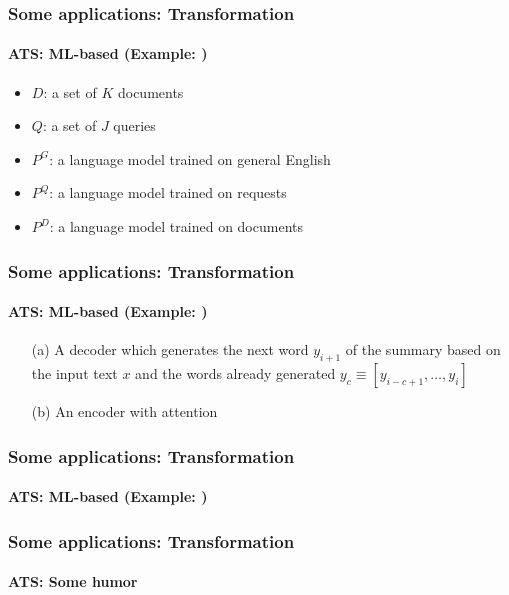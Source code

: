 \documentclass[xcolor=table]{beamer}
\begin{document}
\begin{frame}
	\frametitle{Some applications: Transformation}
	\framesubtitle{ATS: ML-based (Example: \cite{06-daumeiii-marcu})}
	
	\begin{minipage}{.6\textwidth}
		\begin{itemize}
			\item $D$: a set of $K$ documents
			\item $Q$: a set of $J$ queries
			\item $P^G$: a language model trained on general English 
			\item $P^Q$: a language model trained on requests
			\item $P^D$: a language model trained on documents
		\end{itemize}
	\end{minipage}
	\begin{minipage}{.38\textwidth}
	\end{minipage}
	
\end{frame}

\begin{frame}
	\frametitle{Some applications: Transformation}
	\framesubtitle{ATS: ML-based (Example: \cite{15-rush-al})}
	
	\begin{center}
	\end{center}
	
	\begin{itemize}
		\item[(a)] A decoder which generates the next word $y_{i+1}$ of the summary based on the input text $x$ and the words already generated $y_c \equiv [y_{i-c+1},\ldots, y_i]$
		\item[(b)] An encoder with attention
	\end{itemize}
	
\end{frame}

\begin{frame}
	\frametitle{Some applications: Transformation}
	\framesubtitle{ATS: ML-based (Example: \cite{18-narayan-al})}
	
	
\end{frame}

\begin{frame}
	\frametitle{Some applications: Transformation}
	\framesubtitle{ATS: Some humor}
	
	\begin{center}
	\end{center}
	
\end{frame}
\end{document}
